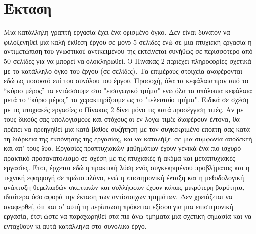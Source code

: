 \section{Έκταση}
\label{sec:έκταση}
Μια κατάλληλη γραπτή εργασία έχει ένα ορισμένο όγκο. Δεν είναι δυνατόν να φιλοξενηθεί μια καλή έκθεση έργου σε μόνο 5 σελίδες ενώ σε μια πτυχιακή εργασία η αντιμετώπιση του γνωστικού αντικειμένου της εκτείνεται συνήθως σε περισσότερο από 50 σελίδες για να μπορεί να ολοκληρωθεί. Ο Πίνακας 2 περιέχει πληροφορίες σχετικά με το κατάλληλο όγκο του έργου (σε σελίδες). Τα επιμέρους στοιχεία αναφέρονται εδώ ως ποσοστό επί του συνόλου του έργου. Προσοχή, όλα τα κεφάλαια πριν από το “κύριο μέρος” τα εντάσσουμε στο "εισαγωγικό τμήμα" ενώ όλα τα υπόλοιπα κεφάλαια μετά το “κύριο μέρος” τα χαρακτηρίζουμε ως το "τελευταίο τμήμα".
Ειδικά σε σχέση με τις πτυχιακές εργασίες ο Πίνακας 2 δίνει μόνο τις κατά προσέγγιση τιμές. Αν με τους δικούς σας υπολογισμούς και στόχους οι εν λόγω τιμές διαφέρουν έντονα, θα πρέπει να προηγηθεί μια κατά βάθος συζήτηση με τον συγκεκριμένο επόπτη σας κατά τη διάρκεια της εκπόνησης της εργασίας, και να καταλήξει σε μια συμφωνία αποδεκτή και απ' τους δύο.
Εργασίες προπτυχιακών μαθημάτων έχουν γενικά ένα πιο ισχυρό πρακτικό προσανατολισμό σε σχέση με τις πτυχιακές ή ακόμα και μεταπτυχιακές εργασίες. Έτσι, έρχεται εδώ η πρακτική λύση ενός συγκεκριμένου προβλήματος και η τεχνική εφαρμογή σε πρώτο πλάνο, ενώ η επιστημονική ένταξη και η μεθοδολογική ανάπτυξη θεμελιωδών σκεπτικών και συλλήψεων έχουν κάπως μικρότερη βαρύτητα, ιδιαίτερα όσο αφορά την έκταση των αντίστοιχων τμημάτων. Δεν χρειάζεται να αναφερθεί, ότι και σ' αυτή τη περίπτωση πρόκειται εξίσου για μια επιστημονική εργασία, έτσι ώστε να παραχωρηθεί στα πιο άνω τμήματα μια σχετική σημασία και να ενταχθούν κι αυτά κατάλληλα στο συνολικό έργο.


